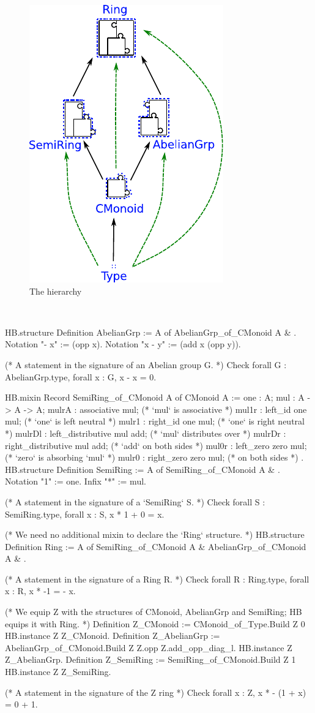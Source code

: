 \documentclass{easychair}
\begin{document}
\begin{figure}
  \vspace{1em}
  \includegraphics[width=.35\textwidth]{diagram.pdf}
  \vspace{-1.5em}
  \caption{The hierarchy}
  \label{fig:hierarchy}
\end{figure}
\
\begin{coqcode}

HB.structure Definition AbelianGrp := { A of AbelianGrp_of_CMonoid A & }.
Notation "- x" := (opp x).
Notation "x - y" := (add x (opp y)).

(* A statement in the signature of an Abelian group G. *)
Check forall G : AbelianGrp.type, forall x : G, x - x = 0.

HB.mixin Record SemiRing_of_CMonoid A of CMonoid A := {
  one    : A;
  mul    : A -> A -> A;
  mulrA  : associative mul;  (* `mul` is associative   *)
  mul1r  : left_id one mul;  (* `one` is left neutral  *)
  mulr1  : right_id one mul; (* `one` is right neutral *)
  mulrDl : left_distributive mul add;  (* `mul` distributes over *)
  mulrDr : right_distributive mul add; (*   `add` on both sides  *)
  mul0r  : left_zero zero mul;  (* `zero` is absorbing `mul`     *)
  mulr0  : right_zero zero mul; (*   on both sides               *)
}.
HB.structure Definition SemiRing := { A of SemiRing_of_CMonoid A & }.
Notation "1" := one.
Infix    "*" := mul.

(* A statement in the signature of a `SemiRing` S.  *)
Check forall S : SemiRing.type, forall x : S, x * 1 + 0 = x.

(* We need no additional mixin to declare the `Ring` structure. *)
HB.structure Definition Ring := { A of SemiRing_of_CMonoid A & AbelianGrp_of_CMonoid A & }.

(* A statement in the signature of a Ring R.  *)
Check forall R : Ring.type, forall x : R, x * -1 = - x.

(* We equip Z with the structures of CMonoid, AbelianGrp and SemiRing; HB equips it with Ring. *)
Definition Z_CMonoid    := CMonoid_of_Type.Build Z 0%
HB.instance Z Z_CMonoid.
Definition Z_AbelianGrp := AbelianGrp_of_CMonoid.Build Z Z.opp Z.add_opp_diag_l.
HB.instance Z Z_AbelianGrp.
Definition Z_SemiRing   := SemiRing_of_CMonoid.Build Z 1%
HB.instance Z Z_SemiRing.

(* A statement in the signature of the Z ring *)
Check forall x : Z, x * - (1 + x) = 0 + 1.
\end{coqcode}
\end{document}
